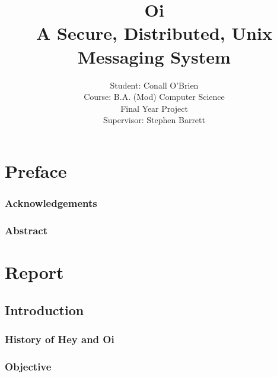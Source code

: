 \documentclass[a4paper,12pt]{report}
\begin{document}
\title{Oi \\ A Secure, Distributed, Unix Messaging System}

\author{Student: Conall O'Brien \\ 
		  Course:  B.A. (Mod) Computer Science \\
		  Final Year Project \\ 
		  Supervisor: Stephen Barrett} 

\maketitle


\part*{Preface}


\section{Acknowledgements}



\pagebreak

\section{Abstract}

\todo


\tableofcontents

\listoftables

\listoffigures


\part*{Report}


\chapter{Introduction}

\setcounter{page}{12}

\section{History of Hey and Oi}



\section{Objective}
\end{document}
